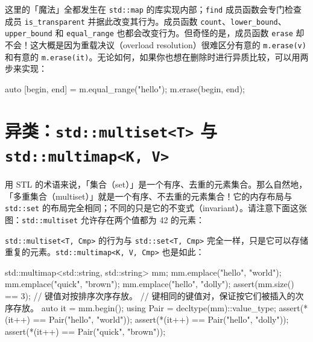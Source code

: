 这里的「魔法」全都发生在 \texttt{std::\allowbreak{}map} 的库实现内部；\texttt{find} 成员函数会专门检查成员 \texttt{is\_\allowbreak{}transparent} 并据此改变其行为。成员函数 \texttt{count}、\texttt{lower\_\allowbreak{}bound}、\texttt{upper\_\allowbreak{}bound} 和 \texttt{equal\_\allowbreak{}range} 也都会改变行为。但奇怪的是，成员函数 \texttt{erase} 却不会！这大概是因为重载决议（overload resolution）很难区分有意的 \texttt{m.\allowbreak{}erase(\allowbreak{}v)\allowbreak{}} 和有意的 \texttt{m.\allowbreak{}erase(\allowbreak{}it)\allowbreak{}}。无论如何，如果你也想在删除时进行异质比较，可以用两步来实现：

\begin{codebox}[cpp]
    auto [begin, end] = m.equal_range("hello");
    m.erase(begin, end);
\end{codebox}

\section{异类：\texttt{std::\allowbreak{}multiset<\allowbreak{}T>\allowbreak{}} 与 \texttt{std::\allowbreak{}multimap<\allowbreak{}K,\allowbreak{} V>\allowbreak{}}}

用 STL 的术语来说，「集合（set）」是一个有序、去重的元素集合。那么自然地，「多重集合（multiset）」就是一个有序、不去重的元素集合！它的内存布局与 \texttt{std::\allowbreak{}set} 的布局完全相同；不同的只是它的不变式（invariant）。请注意下面这张图：\texttt{std::\allowbreak{}multiset} 允许存在两个值都为 42 的元素：


\texttt{std::\allowbreak{}multiset<\allowbreak{}T,\allowbreak{} Cmp>\allowbreak{}} 的行为与 \texttt{std::\allowbreak{}set<\allowbreak{}T,\allowbreak{} Cmp>\allowbreak{}} 完全一样，只是它可以存储重复的元素。\texttt{std::\allowbreak{}multimap<\allowbreak{}K,\allowbreak{} V,\allowbreak{} Cmp>\allowbreak{}} 也是如此：

\begin{codebox}[cpp]
    std::multimap<std::string, std::string> mm;
    mm.emplace("hello", "world");
    mm.emplace("quick", "brown");
    mm.emplace("hello", "dolly");
    assert(mm.size() == 3);
    // 键值对按排序次序存放。
    // 键相同的键值对，保证按它们被插入的次序存放。
    auto it = mm.begin();
    using Pair = decltype(mm)::value_type;
    assert(*(it++) == Pair("hello", "world"));
    assert(*(it++) == Pair("hello", "dolly"));
    assert(*(it++) == Pair("quick", "brown"));
\end{codebox}

